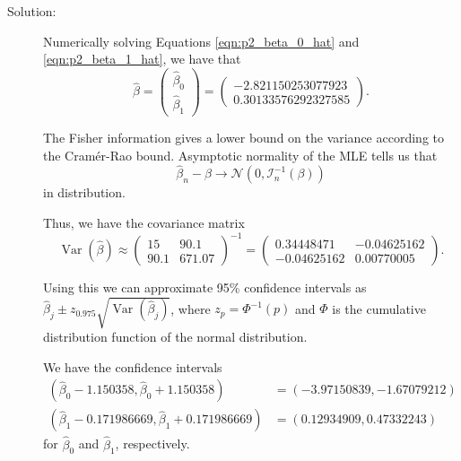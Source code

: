 \documentclass[letterpaper,11pt]{article}
\begin{document}
\begin{enumerate}
\begin{enumerate}
    \begin{description}
    \item[Solution:] Numerically solving Equations \ref{eqn:p2_beta_0_hat} and
      \ref{eqn:p2_beta_1_hat}, we have that
      \begin{equation}
        \hat{\beta} =
        \begin{pmatrix}
          \hat{\beta}_0 \\
          \hat{\beta}_1
        \end{pmatrix}
        =
        \begin{pmatrix}
          -2.821150253077923 \\
          0.30133576292327585
        \end{pmatrix}.
        \label{eqn:p2_beta_hat_mle}
      \end{equation}

      The Fisher information gives a lower bound on the variance according to
      the Cram\'er-Rao bound. Asymptotic normality of the MLE tells us that
      \begin{equation*}
        \hat{\beta}_n - \beta \rightarrow
        \mathcal{N}\left(0, \mathcal{I}_n^{-1}\left(\beta\right)\right)
      \end{equation*}
      in distribution.

      Thus, we have the covariance matrix
      \begin{equation}
        \operatorname{Var}\left(\hat{\beta}\right)
        \approx \begin{pmatrix}
          15 & 90.1 \\
          90.1 & 671.07
        \end{pmatrix}^{-1}
        = \begin{pmatrix}
          0.34448471 & -0.04625162 \\
          -0.04625162 & 0.00770005
        \end{pmatrix}.
      \end{equation}

      Using this we can approximate 95\% confidence intervals as
      $\hat{\beta}_j \pm
      z_{0.975}\sqrt{\operatorname{Var}\left(\hat{\beta}_j\right)}$, where
      $z_{p} = \Phi^{-1}\left(p\right)$ and $\Phi$ is the cumulative
      distribution function of the normal distribution.

      We have the confidence intervals
      \begin{align}
        \left(
        \hat{\beta}_0 - 1.150358,
        \hat{\beta}_0 + 1.150358
        \right)
        &= \left(
          -3.97150839, -1.67079212
        \right) \nonumber\\
        \left(
        \hat{\beta}_1 - 0.171986669,
        \hat{\beta}_1 + 0.171986669
        \right)
        &= \left(
          0.12934909, 0.47332243
          \right)
          \label{eqn:p2_confidence_interval}
      \end{align}
      for $\hat{\beta}_0$ and $\hat{\beta}_1$, respectively.
      


\end{description}
\end{enumerate}
\end{enumerate}
\end{document}
